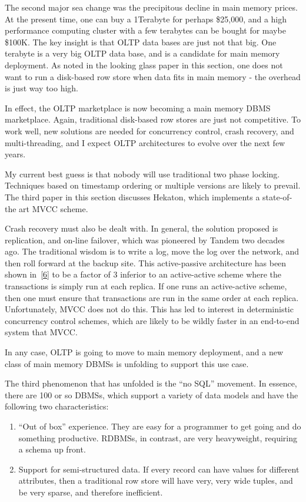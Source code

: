 \documentclass[b5paper,11pt,twoside,openright]{book}
\begin{document}
The second major sea change was the precipitous decline in main memory
prices. At the present time, one can buy a 1Terabyte for perhaps
\$25,000, and a high performance computing cluster with a few terabytes
can be bought for maybe \$100K. The key insight is that OLTP data bases
are just not that big. One terabyte is a very big OLTP data base, and is
a candidate for main memory deployment. As noted in the looking glass
paper in this section, one does not want to run a disk-based row store
when data fits in main memory - the overhead is just way too high.

In effect, the OLTP marketplace is now becoming a main memory DBMS
marketplace. Again, traditional disk-based row stores are just not
competitive. To work well, new solutions are needed for concurrency
control, crash recovery, and multi-threading, and I expect OLTP
architectures to evolve over the next few years.

My current best guess is that nobody will use traditional two phase
locking. Techniques based on timestamp ordering or multiple versions are
likely to prevail. The third paper in this section discusses Hekaton,
which implements a state-of-the art MVCC scheme.

Crash recovery must also be dealt with. In general, the solution
proposed is replication, and on-line failover, which was pioneered by
Tandem two decades ago. The traditional wisdom is to write a log, move
the log over the network, and then roll forward at the backup site. This
active-passive architecture has been shown
in~{{[}\protect\hyperlink{ref-commandlogging}{6}{]}} to be a factor of 3
inferior to an active-active scheme where the transactions is simply run
at each replica. If one runs an active-active scheme, then one must
ensure that transactions are run in the same order at each replica.
Unfortunately, MVCC does not do this. This has led to interest in
deterministic concurrency control schemes, which are likely to be wildly
faster in an end-to-end system that MVCC.

In any case, OLTP is going to move to main memory deployment, and a new
class of main memory DBMSs is unfolding to support this use case.

The third phenomenon that has unfolded is the ``no SQL'' movement. In
essence, there are 100 or so DBMSs, which support a variety of data
models and have the following two characteristics:

\begin{enumerate}
  \item
  ``Out of box'' experience. They are easy for a programmer to get going
  and do something productive. RDBMSs, in contrast, are very
  heavyweight, requiring a schema up front.
  \item
  Support for semi-structured data. If every record can have values for
  different attributes, then a traditional row store will have very,
  very wide tuples, and be very sparse, and therefore inefficient.
\end{enumerate}
\end{document}
